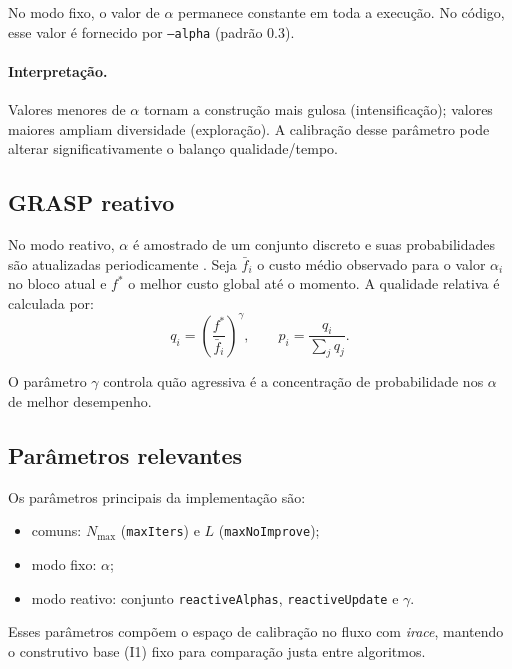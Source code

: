 No modo fixo, o valor de $\alpha$ permanece constante em toda a execução.
No código, esse valor é fornecido por \texttt{--alpha} (padrão 0.3).

\paragraph{Interpretação.}
Valores menores de $\alpha$ tornam a construção mais gulosa (intensificação);
valores maiores ampliam diversidade (exploração).
A calibração desse parâmetro pode alterar significativamente o balanço qualidade/tempo.

\subsection{GRASP reativo}

No modo reativo, $\alpha$ é amostrado de um conjunto discreto e suas probabilidades são atualizadas periodicamente \cite{prais2000reactive}.
Seja $\bar{f}_i$ o custo médio observado para o valor $\alpha_i$ no bloco atual e $f^*$ o melhor custo global até o momento.
A qualidade relativa é calculada por:
\[
q_i = \left(\frac{f^*}{\bar{f}_i}\right)^\gamma,
\qquad
p_i = \frac{q_i}{\sum_j q_j}.
\]

O parâmetro $\gamma$ controla quão agressiva é a concentração de probabilidade nos $\alpha$ de melhor desempenho.

\subsection{Parâmetros relevantes}

Os parâmetros principais da implementação são:
\begin{itemize}
  \item comuns: $N_{\max}$ (\texttt{maxIters}) e $L$ (\texttt{maxNoImprove});
  \item modo fixo: $\alpha$;
  \item modo reativo: conjunto \texttt{reactiveAlphas}, \texttt{reactiveUpdate} e $\gamma$.
\end{itemize}

Esses parâmetros compõem o espaço de calibração no fluxo com \emph{irace}, mantendo o construtivo base (I1) fixo para comparação justa entre algoritmos.
